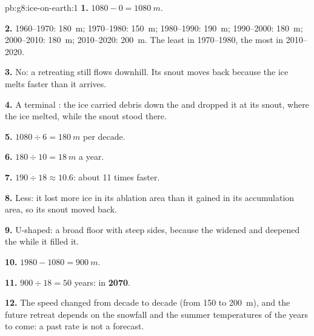\begin{solution}{pb:g8:ice-on-earth:1}
\textbf{1.} $1080 - 0 = \qty{1080}{m}$.

\textbf{2.} 1960--1970: \qty{180}{m}; 1970--1980: \qty{150}{m};
1980--1990: \qty{190}{m}; 1990--2000: \qty{180}{m}; 2000--2010:
\qty{180}{m}; 2010--2020: \qty{200}{m}. The least in 1970--1980, the most
in 2010--2020.

\textbf{3.} No: a retreating  still flows downhill. Its snout moves
back because the ice melts faster than it arrives.

\textbf{4.} A terminal : the ice carried  debris down the
 and dropped it at its snout, where the ice melted, while the snout
stood there.

\textbf{5.} $1080 \div 6 = \qty{180}{m}$ per decade.

\textbf{6.} $180 \div 10 = \qty{18}{m}$ a year.

\textbf{7.} $190 \div 18 \approx 10.6$: about 11 times faster.

\textbf{8.} Less: it lost more ice in its ablation area than it gained in
its accumulation area, so its snout moved back.

\textbf{9.} U-shaped: a broad floor with steep sides, because the 
widened and deepened the  while it filled it.

\textbf{10.} $1980 - 1080 = \qty{900}{m}$.

\textbf{11.} $900 \div 18 = 50$ years: in \textbf{2070}.

\textbf{12.} The speed changed from decade to decade (from 150 to
\qty{200}{m}), and the future retreat depends on the snowfall and the
summer temperatures of the years to come: a past rate is not a forecast.
\end{solution}
